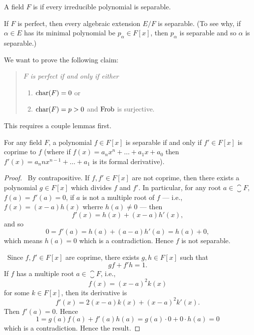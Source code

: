 \begin{definition}
A field $F$ is  if every irreducible polynomial is separable.
\end{definition}

\begin{note}
If $F$ is perfect, then every algebraic extension $E/F$ is
separable. (To see why, if $\alpha\in E$ has its minimal polynomial be
$p_{\alpha}\in F[x]$, then $p_{\alpha}$ is separable and so $\alpha$
is separable.)
\end{note}

\begin{node}
We want to prove the following claim:
\begin{quote}\it $F$ is perfect if and only if either
  \begin{enumerate}
  \item $\operatorname{char}(F)=0$ or
  \item $\operatorname{char}(F)=p>0$ and $\operatorname{Frob}$ is surjective.
  \end{enumerate}
\end{quote}
This requires a couple lemmas first.
\end{node}

\begin{lemma}\label{lemma:5.3}
For any field $F$, a polynomial $f\in F[x]$ is separable if and only
if $f'\in F[x]$ is coprime to $f$ (where if $f(x)=a_{n}x^{n}+\dots+a_{1}x+a_{0}$
then $f'(x)=a_{n}nx^{n-1}+\dots+a_{1}$ is its formal derivative).
\end{lemma}

\begin{proof}
\forwardproof\ By contrapositive. If $f,f'\in F[x]$ are not coprime,
then there exists a polynomial $g\in F[x]$ which divides $f$ and $f'$.
In particular, for any root $a\in\closure{F}$, $f(a)=f'(a)=0$, if $a$
is not a multiple root of $f$ --- i.e., $f(x)=(x-a)h(x)$ wherre
$h(a)\neq0$ --- then
\begin{equation}
f'(x)=h(x)+(x-a)h'(x),
\end{equation}
and so
\begin{equation}
0=f'(a)=h(a)+(a-a)h'(a)=h(a)+0,
\end{equation}
which means $h(a)=0$ which is a contradiction. Hence $f$ is not
separable.

\backwardproof\ Since $f,f'\in F[x]$ are coprime, there exists $g,h\in
F[x]$ such that
\begin{equation}
gf+f'h=1.
\end{equation}
If $f$ has a multiple root $a\in\closure{F}$, i.e.,
\begin{equation}
f(x)=(x-a)^{2}k(x)
\end{equation}
for some $k\in F[x]$, then its derivative is
\begin{equation}
f'(x)=2(x-a)k(x)+(x-a)^{2}k'(x).
\end{equation}
Then $f'(a)=0$. Hence
\begin{equation}
1=g(a)f(a)+f'(a)h(a)=g(a)\cdot0+0\cdot h(a)=0
\end{equation}
which is a contradiction. Hence the result.
\end{proof}


